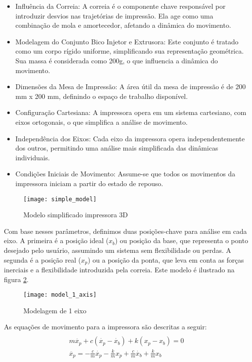 \begin{itemize}
    \item Influência da Correia: A correia é o componente chave responsável por introduzir desvios nas trajetórias de impressão. Ela age como uma combinação de mola e amortecedor, afetando a dinâmica do movimento.
    \item Modelagem do Conjunto Bico Injetor e Extrusora: Este conjunto é tratado como um corpo rígido uniforme, simplificando sua representação geométrica. Sua massa é considerada como 200g, o que influencia a dinâmica do movimento.
    \item Dimensões da Mesa de Impressão: A área útil da mesa de impressão é de 200 mm x 200 mm, definindo o espaço de trabalho disponível.
    \item Configuração Cartesiana: A impressora opera em um sistema cartesiano, com eixos ortogonais, o que simplifica a análise de movimento.
    \item Independência dos Eixos: Cada eixo da impressora opera independentemente dos outros, permitindo uma análise mais simplificada das dinâmicas individuais.
    \item Condições Iniciais de Movimento: Assume-se que todos os movimentos da impressora iniciam a partir do estado de repouso.
\end{itemize}

\begin{figure}[H]
    \centering
    \caption{Modelo simplificado impressora 3D}
    \texttt{[image: simple\_model]}
    \label{fig:simple_model}
\end{figure}
Com base nesses parâmetros, definimos duas posições-chave para análise em cada eixo. A primeira é a posição ideal (\(x_b\)) ou posição da base, que representa o ponto desejado pelo usuário, assumindo um sistema sem flexibilidade ou perdas. A segunda é a posição real (\(x_p\)) ou a posição da ponta, que leva em conta as forças inerciais e a flexibilidade introduzida pela correia. Este modelo é ilustrado na figura \ref{fig:model_1_axis}.

\begin{figure}[H]
    \centering
    \caption{Modelagem de 1 eixo}
    \texttt{[image: model\_1\_axis]}

    \label{fig:model_1_axis}
\end{figure}

As equações de movimento para a impressora são descritas a seguir:
\begin{multline}
    \label{eq:mov_impressora}
    \\
    m \ddot{x_p} + c(\dot{x_p} - \dot{x_b}) + k(x_p-x_b) = 0 \\
    \ddot{x_p} = - \frac{c}{m} \dot{x_p} - \frac{k}{m} x_p + \frac{c}{m} \dot{x_b} + \frac{k}{m} x_b \\
\end{multline}

